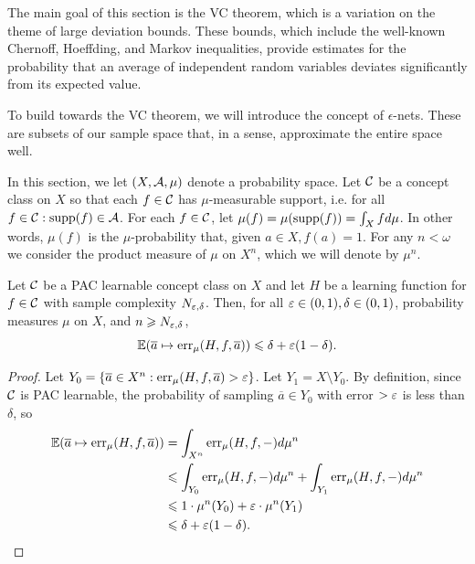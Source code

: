 The main goal of this section is the VC theorem, which is a variation on the theme of large deviation bounds. These bounds, which include the well-known Chernoff, Hoeffding, and Markov inequalities, provide estimates for the probability that an average of independent random variables deviates significantly from its expected value.  

To build towards the VC theorem, we will introduce the concept of $\epsilon$-nets. These are subsets of our sample space that, in a sense, approximate the entire space well.

\begin{remark}
    In this section, we let $(X,\mathcal{A},\mu)$ denote a probability space. Let $\mathcal{C}$ be a concept class on $X$ so that each $f\in\mathcal{C}$ has $\mu$-measurable support, i.e. for all $f\in\mathcal{C} : \operatorname{supp}(f)\in \mathcal{A}$. For each $f\in\mathcal{C}$, let $\mu(f)=\mu(\operatorname{supp}(f))=\int_X f d\mu$. In other words, $\mu(f)$ is the $\mu$-probability that, given $a\in X, f(a)=1$. For any $n<\omega$ we consider the product measure of $\mu$ on $X^n$, which we will denote by $\mu^n$. 
\end{remark}


\begin{lemma}
    \label{lemma:expectedValueOfError}
    Let $\mathcal{C}$ be a PAC learnable concept class on $X$ and let $H$ be a learning function for $f\in \mathcal{C}$ with sample complexity $N_{\varepsilon,\delta}$. Then, for all $\varepsilon\in(0,1), \delta \in (0,1)$, probability measures $\mu$ on $X$, and $n\geqslant N_{\varepsilon,\delta}$,
    $$\operatorname{\mathbb{E}}(\overline{a}\mapsto \operatorname{err}_\mu(H,f,\overline{a})) \leqslant \delta + \varepsilon(1-\delta).$$
\end{lemma}
\begin{proof}
    Let $Y_0=\{\overline{a} \in X^n : \operatorname{err}_\mu(H,f,\overline{a}) > \varepsilon\}$. Let $Y_1 = X\setminus Y_0$. By definition, since $\mathcal{C}$ is PAC learnable, the probability of sampling $\overline{a} \in Y_0$ with error $> \varepsilon$ is less than $\delta$, so
    \begin{align*}
        \operatorname{\mathbb{E}}(\overline{a}\mapsto \operatorname{err}_\mu(H,f,\overline{a})) & = \int_{X^n}\operatorname{err}_\mu(H,f,-) d\mu^n \\
        & \leqslant \int_{Y_0}\operatorname{err}_\mu(H,f,-) d\mu^n + \int_{Y_1}\operatorname{err}_\mu(H,f,-) d\mu^n \\
        & \leqslant  1\cdot \mu^n(Y_0)+\varepsilon \cdot \mu^n(Y_1) \\
        & \leqslant \delta + \varepsilon (1-\delta).
    \end{align*}
\end{proof}

